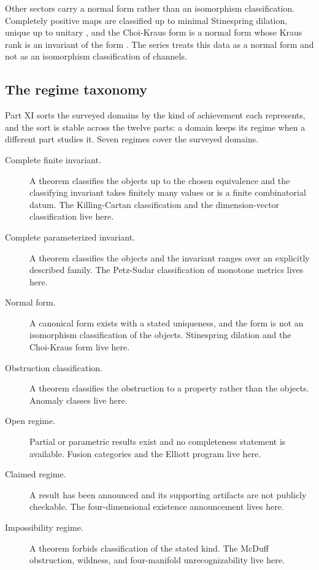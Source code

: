\documentclass[11pt,letterpaper]{article}
\theoremstyle{definition}
\theoremstyle{remark}
\begin{document}
Other sectors carry a normal form rather than an isomorphism classification. Completely positive maps are classified up to minimal Stinespring dilation, unique up to unitary \cite{corpus-10}, and the Choi-Kraus form is a normal form whose Kraus rank is an invariant of the form \cite{corpus-11}. The series treats this data as a normal form and not as an isomorphism classification of channels.

\subsection{The regime taxonomy}

Part XI sorts the surveyed domains by the kind of achievement each represents, and the sort is stable across the twelve parts: a domain keeps its regime when a different part studies it. Seven regimes cover the surveyed domains.

\begin{description}
\item[Complete finite invariant.] A theorem classifies the objects up to the chosen equivalence and the classifying invariant takes finitely many values or is a finite combinatorial datum. The Killing-Cartan classification and the dimension-vector classification live here.
\item[Complete parameterized invariant.] A theorem classifies the objects and the invariant ranges over an explicitly described family. The Petz-Sudar classification of monotone metrics lives here.
\item[Normal form.] A canonical form exists with a stated uniqueness, and the form is not an isomorphism classification of the objects. Stinespring dilation and the Choi-Kraus form live here.
\item[Obstruction classification.] A theorem classifies the obstruction to a property rather than the objects. Anomaly classes live here.
\item[Open regime.] Partial or parametric results exist and no completeness statement is available. Fusion categories and the Elliott program live here.
\item[Claimed regime.] A result has been announced and its supporting artifacts are not publicly checkable. The four-dimensional existence announcement lives here.
\item[Impossibility regime.] A theorem forbids classification of the stated kind. The McDuff obstruction, wildness, and four-manifold unrecognizability live here.
\end{description}
\end{document}
